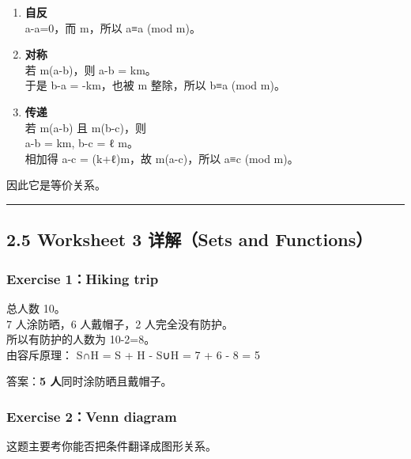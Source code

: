 \documentclass[
  11pt,
]{article}
\begin{document}
\begin{enumerate}
\def\labelenumi{\arabic{enumi}.}
\item
  \textbf{自反}\\
  a-a=0，而 m，所以 a≡a (mod m)。
\item
  \textbf{对称}\\
  若 m\textbar(a-b)，则 a-b = km。\\
  于是 b-a = -km，也被 m 整除，所以 b≡a (mod m)。
\item
  \textbf{传递}\\
  若 m\textbar(a-b) 且 m\textbar(b-c)，则\\
  a-b = km, b-c = ℓ m。\\
  相加得 a-c = (k+ℓ)m，故 m\textbar(a-c)，所以 a≡c (mod m)。
\end{enumerate}

因此它是等价关系。

\begin{center}\rule{0.5\linewidth}{0.5pt}\end{center}

\subsection{2.5 Worksheet 3 详解（Sets and
Functions）}\label{worksheet-3-ux8be6ux89e3sets-and-functions}

\subsubsection{Exercise 1：Hiking trip}\label{exercise-1hiking-trip}

总人数 10。\\
7 人涂防晒，6 人戴帽子，2 人完全没有防护。\\
所以有防护的人数为 10-2=8。\\
由容斥原理： \textbar S∩H\textbar{} = \textbar S\textbar{} +
\textbar H\textbar{} - \textbar S∪H\textbar{} = 7 + 6 - 8 = 5

答案：\textbf{5 人}同时涂防晒且戴帽子。

\subsubsection{Exercise 2：Venn diagram}\label{exercise-2venn-diagram}

这题主要考你能否把条件翻译成图形关系。
\end{document}
